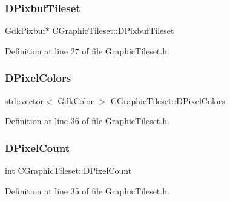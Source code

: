 \subsubsection{\texorpdfstring{D\+Pixbuf\+Tileset}{DPixbufTileset}}
{\footnotesize\ttfamily Gdk\+Pixbuf$\ast$ C\+Graphic\+Tileset\+::\+D\+Pixbuf\+Tileset\hspace{0.3cm}{\ttfamily [protected]}}



Definition at line 27 of file Graphic\+Tileset.\+h.

\hypertarget{classCGraphicTileset_a4e9672b8b133dbac600fb8bb400d1cb3}{}\label{classCGraphicTileset_a4e9672b8b133dbac600fb8bb400d1cb3} 
\subsubsection{\texorpdfstring{D\+Pixel\+Colors}{DPixelColors}}
{\footnotesize\ttfamily std\+::vector$<$ Gdk\+Color $>$ C\+Graphic\+Tileset\+::\+D\+Pixel\+Colors\hspace{0.3cm}{\ttfamily [protected]}}



Definition at line 36 of file Graphic\+Tileset.\+h.

\hypertarget{classCGraphicTileset_a55fc9ceb1c92383c124e61c911fe57db}{}\label{classCGraphicTileset_a55fc9ceb1c92383c124e61c911fe57db} 
\subsubsection{\texorpdfstring{D\+Pixel\+Count}{DPixelCount}}
{\footnotesize\ttfamily int C\+Graphic\+Tileset\+::\+D\+Pixel\+Count\hspace{0.3cm}{\ttfamily [protected]}}



Definition at line 35 of file Graphic\+Tileset.\+h.

\hypertarget{classCGraphicTileset_a650c021d8ea1724a4c9564600df0da05}{}\label{classCGraphicTileset_a650c021d8ea1724a4c9564600df0da05} 
